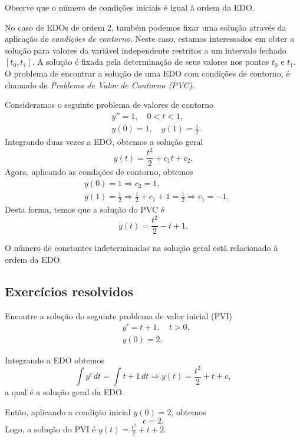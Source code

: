 \begin{obs}
  Observe que o número de condições iniciais é igual à ordem da EDO.
\end{obs}

No caso de EDOs de ordem 2, também podemos fixar uma solução através da aplicação de \emph{condições de contorno}. Neste caso, estamos interessados em obter a solução para valores da variável independente restritos a um intervalo fechado $[t_0, t_1]$. A solução é fixada pela determinação de seus valores nos pontos $t_0$ e $t_1$. O problema de encontrar a solução de uma EDO com condições de contorno, é chamado de \emph{Problema de Valor de Contorno (PVC)}.

\begin{ex}
  Consideramos o seguinte problema de valores de contorno
  \begin{align}
    &y'' = 1,\quad 0 < t < 1,\\
    &y(0) = 1,\quad y(1) = \frac{1}{2}.
  \end{align}
  Integrando duas vezes a EDO, obtemos a solução geral
  \begin{equation}
    y(t) = \frac{t^2}{2} + c_1t + c_2.
  \end{equation}
  Agora, aplicando as condições de contorno, obtemos
  \begin{align}
    &y(0) = 1 \Rightarrow c_2 = 1,\\
    &y(1) = \frac{1}{2} \Rightarrow \frac{1}{2} + c_1 + 1 = \frac{1}{2} \Rightarrow c_1 = -1.
  \end{align}
  Desta forma, temos que a solução do PVC é
  \begin{equation}
    y(t) = \frac{t^2}{2} -t + 1.
  \end{equation}
\end{ex}

\begin{obs}
  O número de constantes indeterminadas na solução geral está relacionado à ordem da EDO.
\end{obs}

\subsection*{Exercícios resolvidos}

\begin{exeresol}
  Encontre a solução do seguinte problema de valor inicial (PVI)
  \begin{align}
    &y' = t + 1,\quad t>0,\\
    &y(0) = 2.
  \end{align}
\end{exeresol}
\begin{resol}
  Integrando a EDO obtemos
  \begin{equation}
    \int y'\,dt = \int t+1\,dt \Rightarrow y(t) = \frac{t^2}{2} + t + c,
  \end{equation}
  a qual é a solução geral da EDO.

  Então, aplicando a condição inicial $y(0) = 2$, obtemos
  \begin{equation}
    c = 2.
  \end{equation}
  Logo, a solução do PVI é $y(t) = \frac{t^2}{2} + t + 2$.
\end{resol}

